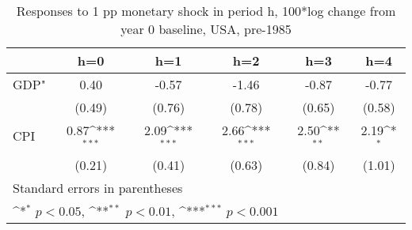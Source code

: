 \begin{table}[htbp]\centering
\def\sym#1{\ifmmode^{#1}\else\(^{#1}\)\fi}
\caption{Responses to 1 pp monetary shock in period h, 100*log change from year 0 baseline, USA, pre-1985}
\begin{tabular}{l*{5}{c}}
\hline\hline
            &\multicolumn{1}{c}{h=0}&\multicolumn{1}{c}{h=1}&\multicolumn{1}{c}{h=2}&\multicolumn{1}{c}{h=3}&\multicolumn{1}{c}{h=4}\\
\hline
GDP"        &        0.40         &       -0.57         &       -1.46         &       -0.87         &       -0.77         \\
            &      (0.49)         &      (0.76)         &      (0.78)         &      (0.65)         &      (0.58)         \\
[1em]
CPI         &        0.87\sym{***}&        2.09\sym{***}&        2.66\sym{***}&        2.50\sym{**} &        2.19\sym{*}  \\
            &      (0.21)         &      (0.41)         &      (0.63)         &      (0.84)         &      (1.01)         \\
\hline\hline
\multicolumn{6}{l}{\footnotesize Standard errors in parentheses}\\
\multicolumn{6}{l}{\footnotesize \sym{*} \(p<0.05\), \sym{**} \(p<0.01\), \sym{***} \(p<0.001\)}\\
\end{tabular}
\end{table}
